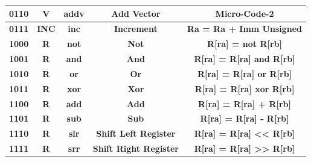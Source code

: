 \documentclass{article}  %
\begin{document}
\begin{table}[H]
\begin{tabular}{|c|*{4}{c|}}
        \multicolumn{1}{|c|}{\textbf{0110}}    & \multicolumn{1}{c|}{\textbf{V}}     & \multicolumn{1}{c|}{\textbf{addv}}      & \multicolumn{1}{c|}{\textbf{Add Vector}}              & \multicolumn{1}{c|}{\textbf{Micro-Code-2}}  \\ \hline
        \multicolumn{1}{|c|}{\textbf{0111}}    & \multicolumn{1}{c|}{\textbf{INC}}   & \multicolumn{1}{c|}{\textbf{inc}}       & \multicolumn{1}{c|}{\textbf{Increment}}               & \multicolumn{1}{c|}{\textbf{Ra = Ra + Imm Unsigned}}  \\ \hline
        \multicolumn{1}{|c|}{\textbf{1000}}    & \multicolumn{1}{c|}{\textbf{R}}     & \multicolumn{1}{c|}{\textbf{not}}       & \multicolumn{1}{c|}{\textbf{Not}}                     & \multicolumn{1}{c|}{\textbf{R[ra] = not R[rb]}}  \\ \hline
        \multicolumn{1}{|c|}{\textbf{1001}}    & \multicolumn{1}{c|}{\textbf{R}}     & \multicolumn{1}{c|}{\textbf{and}}       & \multicolumn{1}{c|}{\textbf{And}}                     & \multicolumn{1}{c|}{\textbf{R[ra] = R[ra] and R[rb]}}  \\ \hline
        \multicolumn{1}{|c|}{\textbf{1010}}    & \multicolumn{1}{c|}{\textbf{R}}     & \multicolumn{1}{c|}{\textbf{or}}        & \multicolumn{1}{c|}{\textbf{Or}}                      & \multicolumn{1}{c|}{\textbf{R[ra] = R[ra] or R[rb]}}  \\ \hline
        \multicolumn{1}{|c|}{\textbf{1011}}    & \multicolumn{1}{c|}{\textbf{R}}     & \multicolumn{1}{c|}{\textbf{xor}}       & \multicolumn{1}{c|}{\textbf{Xor}}                     & \multicolumn{1}{c|}{\textbf{R[ra] = R[ra] xor R[rb]}}  \\ \hline
        \multicolumn{1}{|c|}{\textbf{1100}}    & \multicolumn{1}{c|}{\textbf{R}}     & \multicolumn{1}{c|}{\textbf{add}}       & \multicolumn{1}{c|}{\textbf{Add}}                     & \multicolumn{1}{c|}{\textbf{R[ra] = R[ra] + R[rb]}}  \\ \hline
        \multicolumn{1}{|c|}{\textbf{1101}}    & \multicolumn{1}{c|}{\textbf{R}}     & \multicolumn{1}{c|}{\textbf{sub}}       & \multicolumn{1}{c|}{\textbf{Sub}}                     & \multicolumn{1}{c|}{\textbf{R[ra] = R[ra] - R[rb]}}  \\ \hline
        \multicolumn{1}{|c|}{\textbf{1110}}    & \multicolumn{1}{c|}{\textbf{R}}     & \multicolumn{1}{c|}{\textbf{slr}}       & \multicolumn{1}{c|}{\textbf{Shift Left Register}}     & \multicolumn{1}{c|}{\textbf{R[ra] = R[ra] << R[rb]}}  \\ \hline
        \multicolumn{1}{|c|}{\textbf{1111}}    & \multicolumn{1}{c|}{\textbf{R}}     & \multicolumn{1}{c|}{\textbf{srr}}       & \multicolumn{1}{c|}{\textbf{Shift Right Register }}   & \multicolumn{1}{c|}{\textbf{R[ra] = R[ra] >> R[rb]}}  \\ \hline
      \end{tabular}
    \end{table}
\end{document}
